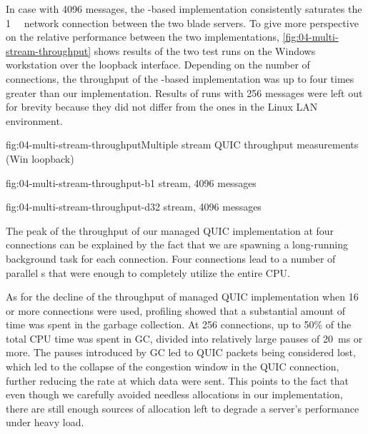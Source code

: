 In case with \SI{4096}{\byte} messages, the \libmsquic{}-based implementation consistently saturates
the \SI{1}{\giga\bit} network connection between the two blade servers. To give more perspective on
the relative performance between the two implementations, \autoref{fig:04-multi-stream-throughput}
shows results of the two test runs on the Windows workstation over the loopback interface. Depending
on the number of connections, the throughput of the \libmsquic{}-based implementation was up to four
times greater than our implementation. Results of runs with \SI{256}{\byte} messages were left out
for brevity because they did not differ from the ones in the Linux LAN environment.

\begin{myFigure}{fig:04-multi-stream-throughput}{Multiple stream QUIC throughput measurements (Win loopback)}
\begin{mySubfigure}{0.49\linewidth}{fig:04-multi-stream-throughput-b}{1 stream, \SI{4096}{\byte} messages}
\footnotesize

\end{mySubfigure}
\begin{mySubfigure}{0.49\linewidth}{fig:04-multi-stream-throughput-d}{32 stream, \SI{4096}{\byte} messages}
\footnotesize

\end{mySubfigure}
\end{myFigure}

The peak of the throughput of our managed QUIC implementation at four connections can be explained
by the fact that we are spawning a long-running background task for each connection. Four
connections lead to a number of parallel s that were enough to completely utilize the
entire CPU\@.

As for the decline of the throughput of managed QUIC implementation when 16 or more connections were
used, profiling showed that a substantial amount of time was spent in the garbage collection. At 256
connections, up to 50\% of the total CPU time was spent in GC, divided into relatively large pauses
of \SI{20}{\milli\second} or more. The pauses introduced by GC led to QUIC packets being considered
lost, which led to the collapse of the congestion window in the QUIC connection, further reducing
the rate at which data were sent. This points to the fact that even though we carefully avoided
needless allocations in our implementation, there are still enough sources of allocation left to
degrade a server's performance under heavy load.

